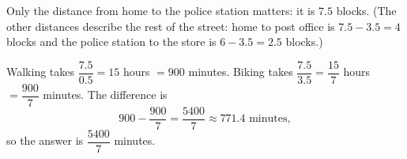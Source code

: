 Only the distance from home to the police station matters: it is $7.5$ blocks. (The other distances describe the rest of the street: home to post office is $7.5-3.5=4$ blocks and the police station to the store is $6-3.5=2.5$ blocks.)

Walking takes $\dfrac{7.5}{0.5}=15$ hours $=900$ minutes. Biking takes $\dfrac{7.5}{3.5}=\dfrac{15}{7}$ hours $=\dfrac{900}{7}$ minutes. The difference is
\[
900-\dfrac{900}{7}=\dfrac{5400}{7}\approx771.4\text{ minutes},
\]
so the answer is $\boxed{\dfrac{5400}{7}}$ minutes.

